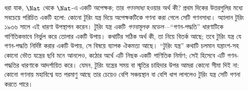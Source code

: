 \documentclass[../../../include/open-logic-section]{subfiles}
\begin{document}

ধরা যাক, $\Nat$ থেকে $\Nat$-এ একটি অপেক্ষক; তার \emph{গণনসাধ্য}
হওয়ার অর্থ কী? প্রথম দিকের উত্তরগুলির মধ্যে সবচেয়ে পরিচিত একটি হলো:
কোনো টুরিং যন্ত্র দিয়ে অপেক্ষকটিকে গণনা করা গেলে সেটি গণনসাধ্য। অ্যালান
টুরিং ১৯৩৬ সালে এই ধারণা উপস্থাপন করেন। টুরিং যন্ত্র একটি
\emph{গণনামূলক মডেল}—“গণন-পদ্ধতি” ধারণাটিকে গাণিতিকভাবে নির্ভুল করে
তোলার একটি উপায়। কথাটির সঠিক অর্থ কী, তা নিয়ে বিতর্ক আছে; তবে টুরিং
যন্ত্র যে গণন-পদ্ধতি নির্দিষ্ট করার একটি উপায়, সে বিষয়ে ব্যাপক ঐকমত্য
আছে। “টুরিং যন্ত্র” কথাটি চলমান যন্ত্রাংশ-সহ কোনো ভৌত যন্ত্রের ছবি মনে
আনলেও, কঠোর অর্থে এটি নিছক একটি গাণিতিক নির্মাণ; সেই হিসেবে এটি
গণন-পদ্ধতির ধারণাকে আদর্শায়িত করে। যেমন, টুরিং যন্ত্রের সময় বা স্মৃতির
চাহিদার উপর আমরা কোনো সীমা দিই না: কোনো গণনায় মহাবিশ্বে যত পরমাণু আছে
তার চেয়েও বেশি সঞ্চয়স্থান বা বেশি ধাপ লাগলেও টুরিং যন্ত্র সেটি গণনা
করতে পারে।
\end{document}

